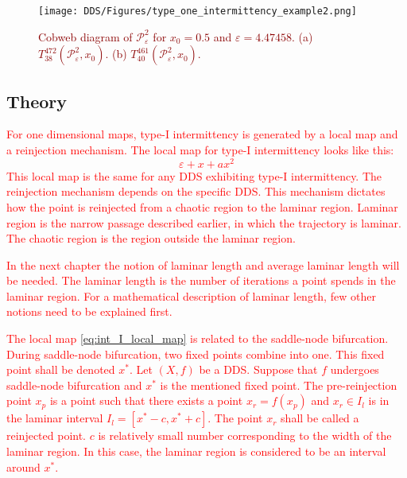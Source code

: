 \begin{figure}[!h]
    \centering
    \texttt{[image: DDS/Figures/type\_one\_intermittency\_example2.png]}
    \caption{
        \textcolor{darkred}{
        Cobweb diagram of $\mathcal{P}_{\varepsilon}^{2}$ for $x_0 = 0.5$ and $\varepsilon = 4.47458$.
        (a) $T^{472}_{38}(\mathcal{P}_{\varepsilon}^{2}, x_0)$. 
        (b) $T^{461}_{40}(\mathcal{P}_{\varepsilon}^{2}, x_0)$. 
        }
    }
    \label{fig:intermittent_cobweb_example}
\end{figure}

\subsection{Theory}

\textcolor{red}{
For one dimensional maps, type-I intermittency is generated by a local map and a reinjection mechanism.
The local map for type-I intermittency looks like this:
\begin{equation}
\varepsilon + x + a x^2 \label{eq:int_I_local_map}
\end{equation}
This local map is the same for any DDS exhibiting type-I intermittency.
The reinjection mechanism depends on the specific DDS.
This mechanism dictates how the point is reinjected from a chaotic region to the laminar region.
Laminar region is the narrow passage described earlier, in which the trajectory is laminar.
The chaotic region is the region outside the laminar region.
}
\par
\textcolor{red}{
In the next chapter the notion of laminar length and average laminar length will be needed.
The laminar length is the number of iterations a point spends in the laminar region.
For a mathematical description of laminar length, few other notions need to be explained first.
}
\par
\textcolor{red}{
The local map \ref{eq:int_I_local_map} is related to the saddle-node bifurcation.
During saddle-node bifurcation, two fixed points combine into one.
This fixed point shall be denoted $x^{*}$.
Let $(X, f)$ be a DDS. Suppose that $f$ undergoes saddle-node bifurcation and $x^{*}$ is the mentioned fixed point.
The pre-reinjection point $x_p$ is a point such that there exists a point $x_r = f(x_p)$ and $x_r \in I_l$ is in the laminar interval $I_l = [ x^{*}-c, x^{*}+c ]$.
The point $x_r$ shall be called a reinjected point.
$c$ is relatively small number corresponding to the width of the laminar region.
In this case, the laminar region is considered to be an interval around $x^{*}$.
}
